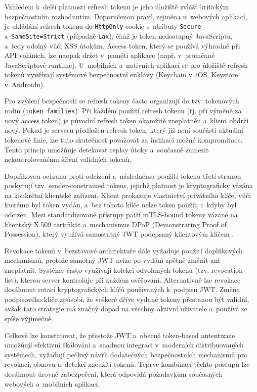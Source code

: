 Vzhledem k~delší platnosti refresh tokenu je jeho úložiště zvlášť kritickým bezpečnostním rozhodnutím.
Doporučenou praxí, zejména u~webových aplikací, je ukládání refresh tokenu do \texttt{HttpOnly} cookie s~atributy \texttt{Secure} a~\texttt{SameSite=Strict} (případně \texttt{Lax}), čímž je token nedostupný JavaScriptu, a~tedy odolný vůči XSS útokům.
Access token, který se používá výhradně při API voláních, lze naopak držet v~paměti aplikace (např. v~proměnné JavaScriptové runtime).
U~mobilních a~nativních aplikací se pro úložiště refresh tokenů využívají systémové bezpečnostní enklávy (Keychain v~iOS, Keystore v~Androidu).

Pro zvýšení bezpečnosti se refresh tokeny často organizují do tzv. tokenových rodin (\texttt{token families}).
Při každém použití refresh tokenu (tj. při výměně za nový access token) je původní refresh token okamžitě zneplatněn a~klient obdrží nový.
Pokud je serveru předložen refresh token, který již není součástí aktuální tokenové linie, lze tuto skutečnost považovat za indikaci možné kompromitace.
Tento princip umožňuje detekovat replay útoky a~současně zamezit nekontrolovanému šíření validních tokenů.

Doplňkovou ochranu proti odcizení a~následnému použití tokenu třetí stranou poskytují tzv. sender-constrained tokens, jejichž platnost je kryptograficky vázána na konkrétní klientské zařízení.
Klient prokazuje vlastnictví privátního klíče, vůči kterému byl token vydán, a~bez tohoto klíče nelze token použít, i~kdyby byl odcizen.
Mezi standardizované přístupy patří mTLS-bound tokeny vázané na klientský X.509 certifikát \cite{rfc-8705} a~mechanismus DPoP (Demonstrating Proof of Possession), který využívá samostatný JWT podepsaný klientovým klíčem \cite{rfc-9449}.

Revokace tokenů v~bezstavové architektuře dále vyžaduje použití doplňkových mechanismů, protože samotný JWT nelze po vydání zpětně změnit ani zneplatnit.
Systémy často využívají kolekci odvolaných tokenů (tzv. revocation list), kterou server kontroluje při každém ověřování. Alternativně lze revokace dosáhnout rotací kryptografických klíčů používaných k~podpisu JWT.
Změna podpisového klíče způsobí, že veškeré dříve vydané tokeny přestanou být validní, avšak tato strategie má značný dopad na všechny aktivní uživatele a~používá se spíše výjimečně.

Celkově lze konstatovat, že přestože JWT a~obecně token-based autentizace umožňují efektivní škálování a~snadnou integraci v~moderních distribuovaných systémech, vyžadují pečlivý návrh dodatečných bezpečnostních mechanismů pro revokaci, obnovu a~detekci zneužití tokenů.
Teprve kombinací těchto postupů lze dosáhnout úrovně zabezpečení, která odpovídá požadavkům současných webových a~mobilních aplikací.

